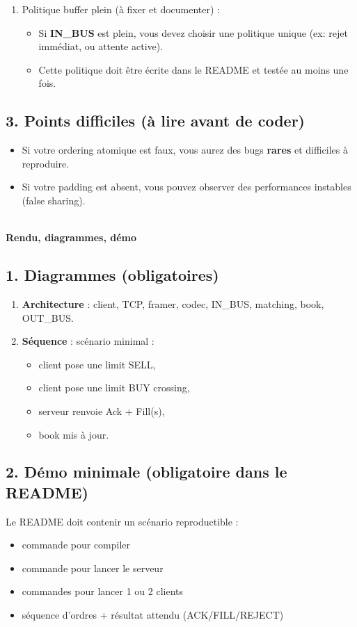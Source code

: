 \documentclass[11pt,a4paper]{article}
\newcommand{\Part}[2]{%
  \vspace{1.0em}
  \noindent{\large\textbf{Part #1}}\\
  \textbf{#2}\\
  \vspace{0.5em}
}
\begin{document}
\begin{enumerate}
  \item Politique buffer plein (à fixer et documenter) :
  \begin{itemize}
    \item Si \textbf{IN\_BUS} est plein, vous devez choisir une politique unique (ex: rejet immédiat, ou attente active).
    \item Cette politique doit être écrite dans le README et testée au moins une fois.
  \end{itemize}
\end{enumerate}

\subsection*{3. Points difficiles (à lire avant de coder)}
\begin{itemize}
  \item Si votre ordering atomique est faux, vous aurez des bugs \textbf{rares} et difficiles à reproduire.
  \item Si votre padding est absent, vous pouvez observer des performances instables (false sharing).
\end{itemize}

\Part{IV}{Rendu, diagrammes, démo}

\subsection*{1. Diagrammes (obligatoires)}
\begin{enumerate}
  \item \textbf{Architecture} : client, TCP, framer, codec, IN\_BUS, matching, book, OUT\_BUS.
  \item \textbf{Séquence} : scénario minimal :
    \begin{itemize}
      \item client pose une limit SELL,
      \item client pose une limit BUY crossing,
      \item serveur renvoie Ack + Fill(s),
      \item book mis à jour.
    \end{itemize}
\end{enumerate}

\subsection*{2. Démo minimale (obligatoire dans le README)}
Le README doit contenir un scénario reproductible :
\begin{itemize}
  \item commande pour compiler
  \item commande pour lancer le serveur
  \item commandes pour lancer 1 ou 2 clients
  \item séquence d’ordres + résultat attendu (ACK/FILL/REJECT)
\end{itemize}
\end{document}
